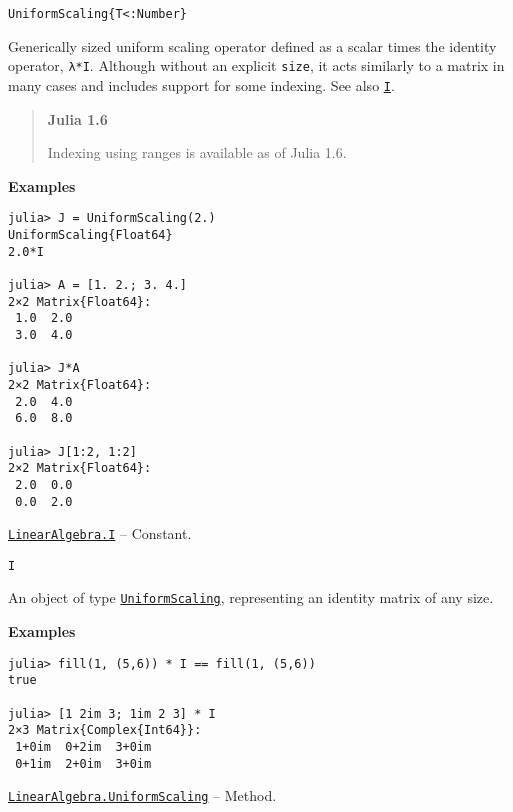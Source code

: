 \begin{adjustwidth}{2em}{0pt}


\begin{verbatim}
UniformScaling{T<:Number}
\end{verbatim}

Generically sized uniform scaling operator defined as a scalar times the identity operator, \texttt{λ*I}. Although without an explicit \texttt{size}, it acts similarly to a matrix in many cases and includes support for some indexing. See also \hyperlink{15346645596018210602}{\texttt{I}}.

\begin{quote}
\textbf{Julia 1.6}

Indexing using ranges is available as of Julia 1.6.

\end{quote}
\textbf{Examples}


\begin{verbatim}
julia> J = UniformScaling(2.)
UniformScaling{Float64}
2.0*I

julia> A = [1. 2.; 3. 4.]
2×2 Matrix{Float64}:
 1.0  2.0
 3.0  4.0

julia> J*A
2×2 Matrix{Float64}:
 2.0  4.0
 6.0  8.0

julia> J[1:2, 1:2]
2×2 Matrix{Float64}:
 2.0  0.0
 0.0  2.0
\end{verbatim}



\end{adjustwidth}
\hypertarget{15346645596018210602}{}
\hyperlink{15346645596018210602}{\texttt{LinearAlgebra.I}}  -- {Constant.}

\begin{adjustwidth}{2em}{0pt}


\begin{verbatim}
I
\end{verbatim}

An object of type \hyperlink{723087258311673942}{\texttt{UniformScaling}}, representing an identity matrix of any size.

\textbf{Examples}


\begin{verbatim}
julia> fill(1, (5,6)) * I == fill(1, (5,6))
true

julia> [1 2im 3; 1im 2 3] * I
2×3 Matrix{Complex{Int64}}:
 1+0im  0+2im  3+0im
 0+1im  2+0im  3+0im
\end{verbatim}



\end{adjustwidth}
\hypertarget{15071872535455102526}{}
\hyperlink{15071872535455102526}{\texttt{LinearAlgebra.UniformScaling}}  -- {Method.}

